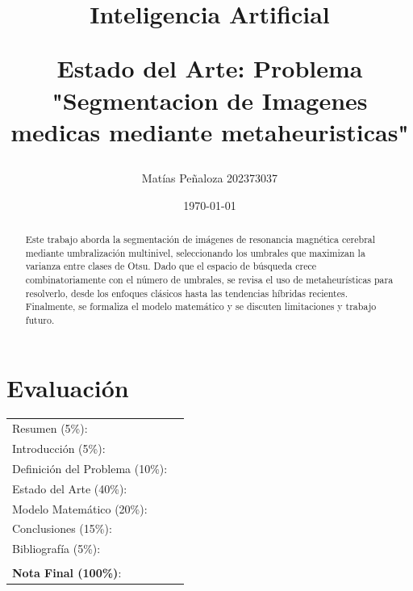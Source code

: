 \documentclass[letter, 10pt]{article}
\begin{document}
\title{Inteligencia Artificial \\ \begin{Large}Estado del Arte: Problema "Segmentacion de Imagenes medicas mediante metaheuristicas"\end{Large}}
\author{Mat\'ias Peñaloza 202373037}
\date{\today}
\maketitle


\section*{Evaluaci\'on}

\begin{tabular}{ll}
Resumen (5\%): & \underline{\hspace{2cm}} \\
Introducci\'on (5\%):  & \underline{\hspace{2cm}} \\
Definici\'on del Problema (10\%):  & \underline{\hspace{2cm}} \\
Estado del Arte (40\%):  & \underline{\hspace{2cm}} \\
Modelo Matem\'atico (20\%): &  \underline{\hspace{2cm}}\\
Conclusiones (15\%): &  \underline{\hspace{2cm}}\\
Bibliograf\'ia (5\%): & \underline{\hspace{2cm}}\\
 &  \\
\textbf{Nota Final (100\%)}:   & \underline{\hspace{2cm}}
\end{tabular}
\vspace{2cm}


\begin{abstract}
Este trabajo aborda la segmentaci\'on de im\'agenes de resonancia magn\'etica cerebral mediante umbralizaci\'on multinivel, seleccionando los umbrales que maximizan la varianza entre clases de Otsu.
Dado que el espacio de b\'usqueda crece combinatoriamente con el n\'umero de umbrales, se revisa el uso de metaheur\'isticas para resolverlo, desde los enfoques cl\'asicos hasta las tendencias h\'ibridas recientes.
Finalmente, se formaliza el modelo matem\'atico y se discuten limitaciones y trabajo futuro.
\end{abstract}
\end{document}
